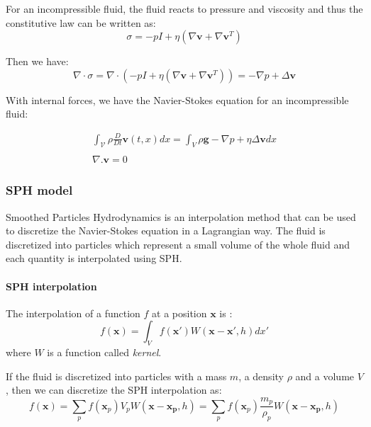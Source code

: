 For an incompressible fluid, the fluid reacts to pressure and viscosity and thus the constitutive law can be written as:
\begin{equation}
\sigma = -pI + \eta \left( \nabla \mathbf{v} + \nabla \mathbf{v}^{T} \right)
\end{equation}

Then we have:
\begin{equation}
\nabla \cdot \sigma = \nabla \cdot \left( -pI + \eta \left( \nabla \mathbf{v} + \nabla \mathbf{v}^{T} \right) \right) = -\nabla p + \Delta \mathbf{v}
\end{equation}

With internal forces, we have the Navier-Stokes equation for an incompressible fluid:

\begin{equation}
\begin{array}{ll}
\displaystyle
\int_{\mathcal{V}} \rho \frac{D}{Dt} \mathbf{v}(t,x) dx = \int_{V} \rho \mathbf{g} -\nabla p + \eta \Delta \mathbf{v} dx \\ \\
\displaystyle
\nabla. \mathbf{v} = 0
\end{array}
\end{equation}

\subsubsection{SPH model}
Smoothed Particles Hydrodynamics is an interpolation method that can be used to discretize the Navier-Stokes equation in a Lagrangian way. The fluid is discretized into particles which represent a small volume of the whole fluid and each quantity is interpolated using SPH.

\paragraph{SPH interpolation}
The interpolation of a function $f$ at a position $\mathbf{x}$ is :
\begin{equation}
f(\mathbf{x}) = \int_{V} f(\mathbf{x'})W(\mathbf{x}-\mathbf{x'}, h)dx'
\end{equation}
where $W$ is a function called \emph{kernel}. 

If the fluid is discretized into particles with a mass $m$, a density $\rho$ and a volume $V$, then we can discretize the SPH interpolation as:
\begin{equation}
f(\mathbf{x}) = \sum_{p} f(\mathbf{x}_{p})V_{p} W(\mathbf{x}-\mathbf{x_{p}},h) = \sum_{p} f(\mathbf{x}_{p})\frac{m_{p}}{\rho_{p}} W(\mathbf{x}-\mathbf{x_{p}},h)
\end{equation}

